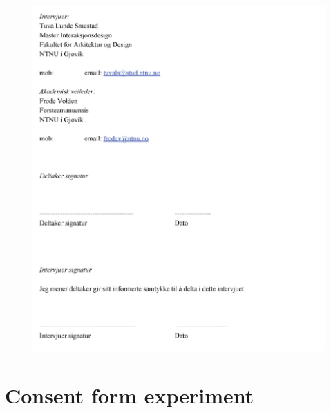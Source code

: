     \begin{figure}
        \centering
        \includegraphics[scale=0.8]{figures/samtykkeint2.pdf}
    \end{figure}

\section{Consent form experiment}
    \label{consentexperiment}

